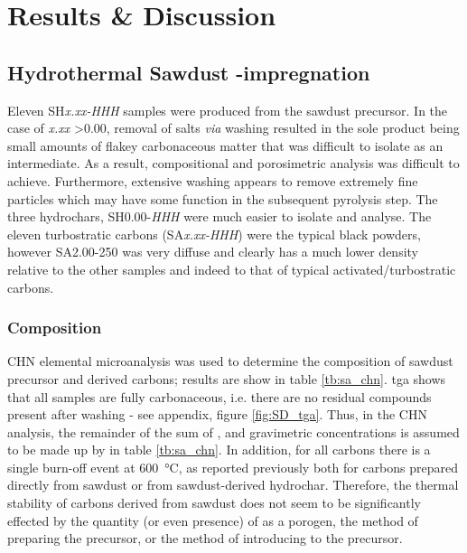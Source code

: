 \section{Results \& Discussion}
\subsection[Hydrothermal Sawdust KOH-impregnation]{Hydrothermal Sawdust -impregnation}
\label{ss:sd_results}

Eleven SH\textit{x.xx-HHH} samples were produced from the sawdust precursor. In the case of \textit{x.xx} \num{>0.00}, removal of  salts \textit{via} washing resulted in the sole product being small amounts of flakey carbonaceous matter that was difficult to isolate as an intermediate. As a result, compositional and porosimetric analysis was difficult to achieve. Furthermore, extensive washing appears to remove extremely fine particles which may have some function in the subsequent pyrolysis step. The three \glspl{hydrochar}, SH0.00-\textit{HHH} were much easier to isolate and analyse. The eleven \glspl{turbostratic carbon} (SA\textit{x.xx-HHH}) were the typical black powders, however SA2.00-250 was very diffuse and clearly has a much lower density relative to the other samples and indeed to that of typical activated/\glspl{turbostratic carbon}.

\subsubsection{Composition}

CHN elemental microanalysis was used to determine the composition of sawdust precursor and derived carbons; results are show in table \ref{tb:sa_chn}. \acrshort{tga} shows that all samples are fully carbonaceous, i.e. there are no residual  compounds present after washing - see appendix, figure \ref{fig:SD_tga}. Thus, in the CHN analysis, the remainder of the sum of ,  and  gravimetric concentrations is assumed to be made up by  in table \ref{tb:sa_chn}. In addition, for all carbons there is a single burn-off event at \qty{600}{\degreeCelsius}, as reported previously both for carbons prepared directly from sawdust or from sawdust-derived \gls{hydrochar}.\citep{Balahmar2017Biomass} Therefore, the thermal stability of carbons derived from sawdust does not seem to be significantly effected by the quantity (or even presence) of  as a \gls{porogen}, the method of preparing the precursor, or the method of introducing  to the precursor.

